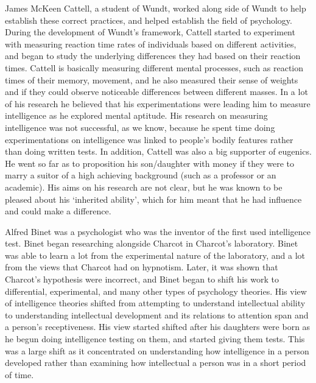 \documentclass[11pt, oneside]{article}
\begin{document}
\par James McKeen Cattell, a student of Wundt, worked along side of Wundt to help establish these correct practices, and helped establish the field of psychology. During the development of Wundt's framework, Cattell started to experiment with measuring reaction time rates of individuals based on different activities, and began to study the underlying differences they had based on their reaction times. Cattell is basically measuring different mental processes, such as reaction times of their memory, movement, and he also measured their sense of weights and if they could observe noticeable differences between different masses. In a lot of his research he believed that his experimentations were leading him to measure intelligence as he explored mental aptitude. His research on measuring intelligence was not successful, as we know, because he spent time doing experimentations on intelligence was linked to people's bodily features rather than doing written tests. In addition, Cattell was also a big supporter of eugenics. He went so far as to proposition his son/daughter with money if they were to marry a suitor of a high achieving background (such as a professor or an academic). His aims on his research are not clear, but he was known to be pleased about his `inherited ability', which for him meant that he had influence and could make a difference.

\par Alfred Binet was a psychologist who was the inventor of the first used intelligence test. Binet began researching alongside Charcot in Charcot's laboratory. Binet was able to learn a lot from the experimental nature of the laboratory, and a lot from the views that Charcot had on hypnotism. Later, it was shown that Charcot's hypothesis were incorrect, and Binet began to shift his work to differential, experimental, and many other types of psychology theories. His view of intelligence theories shifted from attempting to understand intellectual ability to understanding intellectual development and its relations to attention span and a person's receptiveness. His view started shifted after his daughters were born as he begun doing intelligence testing on them, and started giving them tests. This was a large shift as it concentrated on understanding how intelligence in a person developed rather than examining how intellectual a person was in a short period of time.
\end{document}
